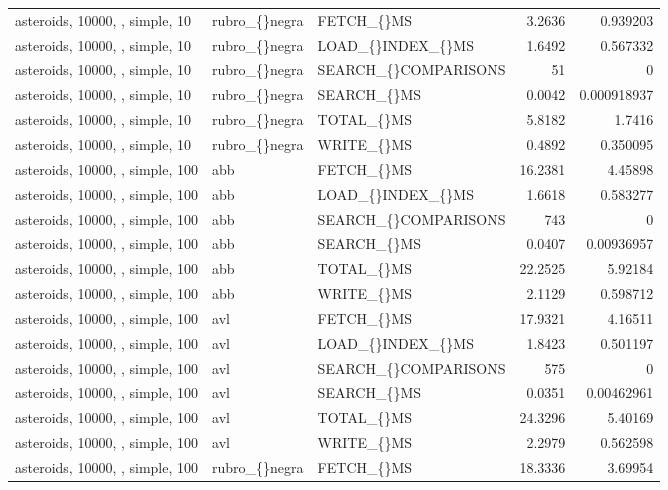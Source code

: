 \begin{longtable}{p{4cm}p{1.4cm}p{2.6cm}rr}
asteroids, 10000, , simple, 10 & rubro\_\allowbreak\{\}negra & FETCH\_\allowbreak\{\}MS & 3.2636 & 0.939203\\
asteroids, 10000, , simple, 10 & rubro\_\allowbreak\{\}negra & LOAD\_\allowbreak\{\}INDEX\_\allowbreak\{\}MS & 1.6492 & 0.567332\\
asteroids, 10000, , simple, 10 & rubro\_\allowbreak\{\}negra & SEARCH\_\allowbreak\{\}COMPARISONS & 51 & 0\\
asteroids, 10000, , simple, 10 & rubro\_\allowbreak\{\}negra & SEARCH\_\allowbreak\{\}MS & 0.0042 & 0.000918937\\
asteroids, 10000, , simple, 10 & rubro\_\allowbreak\{\}negra & TOTAL\_\allowbreak\{\}MS & 5.8182 & 1.7416\\
asteroids, 10000, , simple, 10 & rubro\_\allowbreak\{\}negra & WRITE\_\allowbreak\{\}MS & 0.4892 & 0.350095\\
asteroids, 10000, , simple, 100 & abb & FETCH\_\allowbreak\{\}MS & 16.2381 & 4.45898\\
asteroids, 10000, , simple, 100 & abb & LOAD\_\allowbreak\{\}INDEX\_\allowbreak\{\}MS & 1.6618 & 0.583277\\
asteroids, 10000, , simple, 100 & abb & SEARCH\_\allowbreak\{\}COMPARISONS & 743 & 0\\
asteroids, 10000, , simple, 100 & abb & SEARCH\_\allowbreak\{\}MS & 0.0407 & 0.00936957\\
asteroids, 10000, , simple, 100 & abb & TOTAL\_\allowbreak\{\}MS & 22.2525 & 5.92184\\
asteroids, 10000, , simple, 100 & abb & WRITE\_\allowbreak\{\}MS & 2.1129 & 0.598712\\
asteroids, 10000, , simple, 100 & avl & FETCH\_\allowbreak\{\}MS & 17.9321 & 4.16511\\
asteroids, 10000, , simple, 100 & avl & LOAD\_\allowbreak\{\}INDEX\_\allowbreak\{\}MS & 1.8423 & 0.501197\\
asteroids, 10000, , simple, 100 & avl & SEARCH\_\allowbreak\{\}COMPARISONS & 575 & 0\\
asteroids, 10000, , simple, 100 & avl & SEARCH\_\allowbreak\{\}MS & 0.0351 & 0.00462961\\
asteroids, 10000, , simple, 100 & avl & TOTAL\_\allowbreak\{\}MS & 24.3296 & 5.40169\\
asteroids, 10000, , simple, 100 & avl & WRITE\_\allowbreak\{\}MS & 2.2979 & 0.562598\\
asteroids, 10000, , simple, 100 & rubro\_\allowbreak\{\}negra & FETCH\_\allowbreak\{\}MS & 18.3336 & 3.69954\\

\end{longtable}
